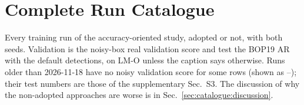 \section{Complete Run Catalogue}
\label{sec:catalogue}
Every training run of the accuracy-oriented study, adopted or not, with both seeds. Validation is
the noisy-box real validation score and test the BOP19 AR with the default detections, on LM-O
unless the caption says otherwise. Runs older than 2026-11-18 have no noisy validation score for
some rows (shown as --); their test numbers are those of the supplementary Sec.~S3. The
discussion of why the non-adopted approaches are worse is in Sec.~\ref{sec:catalogue:discussion}.

